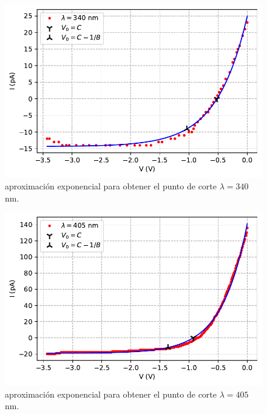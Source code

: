 \documentclass[12pt,a4paper]{article}
\numberwithin{equation}{section}
\numberwithin{table}{section}
\numberwithin{figure}{section}
\begin{document}
\begin{figure}[h!]  \centering
\includegraphics[scale=0.97]{Datos_exponencial_1.pdf}
\caption{aproximación exponencial para obtener el punto de corte $\lambda=340$ nm.}
\label{Fig:6.2.1}
\end{figure}
\newpage
\begin{figure}[h!]  \centering
\includegraphics[scale=0.97]{Datos_exponencial_2.pdf}
\caption{aproximación exponencial para obtener el punto de corte $\lambda=405$ nm.}
\label{Fig:6.2.2}
\end{figure}
\end{document}
